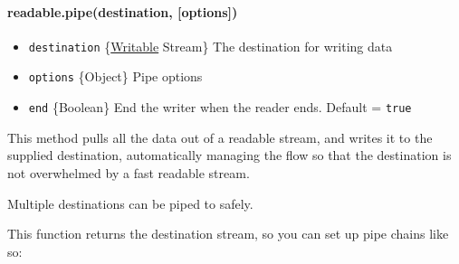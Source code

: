 \paragraph{readable.pipe(destination,
{[}options{]})}\label{readable.pipedestination-options}

\begin{itemize}
\itemsep1pt\parskip0pt
\item
  \texttt{destination}
  \{\hyperref[streamux5fclassux5fstreamux5fwritable]{Writable} Stream\}
  The destination for writing data
\item
  \texttt{options} \{Object\} Pipe options
\item
  \texttt{end} \{Boolean\} End the writer when the reader ends. Default
  = \texttt{true}
\end{itemize}

This method pulls all the data out of a readable stream, and writes it
to the supplied destination, automatically managing the flow so that the
destination is not overwhelmed by a fast readable stream.

Multiple destinations can be piped to safely.

\begin{Shaded}
\begin{Highlighting}[]
 \NormalTok{();}
 \NormalTok{(}\NormalTok{);}
\end{Highlighting}
\end{Shaded}

This function returns the destination stream, so you can set up pipe
chains like so:

\begin{Shaded}
\begin{Highlighting}[]
 \NormalTok{(}\NormalTok{);}
 \NormalTok{();}
 \NormalTok{(}\NormalTok{);}
\end{Highlighting}
\end{Shaded}

